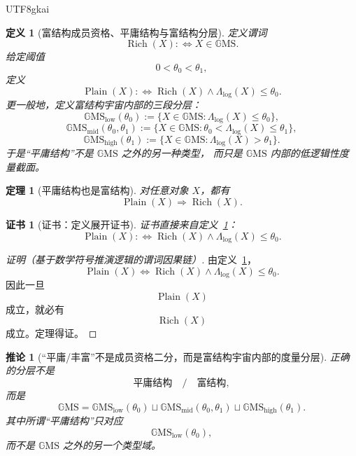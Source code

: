 \documentclass[12pt]{article}
\newtheorem{definition}{定义}[section]
\newtheorem{theorem}{定理}[section]
\newtheorem{corollary}{推论}[section]
\newtheorem{Certificate}{证书}[section]
\newcommand{\GMS}{\mathbb{G}\mathrm{MS}}
\begin{document}
\begin{CJK*}{UTF8}{gkai}
\begin{definition}[富结构成员资格、平庸结构与富结构分层]
\label{def:tex1-ch12-richness}
定义谓词
\[
  \operatorname{Rich}(X)
  :
  \Longleftrightarrow
  X\in \GMS.
\]
给定阈值
\[
  0<\theta_0<\theta_1,
\]
定义
\[
  \operatorname{Plain}(X)
  :
  \Longleftrightarrow
  \operatorname{Rich}(X)\wedge \Lambda_{\mathrm{log}}(X)\le \theta_0.
\]
更一般地，定义富结构宇宙内部的三段分层：
\[
  \GMS_{\mathrm{low}}(\theta_0)
  :=
  \{X\in \GMS:\Lambda_{\mathrm{log}}(X)\le \theta_0\},
\]
\[
  \GMS_{\mathrm{mid}}(\theta_0,\theta_1)
  :=
  \{X\in \GMS:\theta_0<\Lambda_{\mathrm{log}}(X)\le \theta_1\},
\]
\[
  \GMS_{\mathrm{high}}(\theta_1)
  :=
  \{X\in \GMS:\Lambda_{\mathrm{log}}(X)>\theta_1\}.
\]
于是“平庸结构”不是 \(\GMS\) 之外的另一种类型，
而只是 \(\GMS\) 内部的低逻辑性度量截面。
\end{definition}

\begin{theorem}[平庸结构也是富结构]
\label{thm:tex1-ch12-plain-rich}
对任意对象 \(X\)，都有
\[
  \operatorname{Plain}(X)\Rightarrow \operatorname{Rich}(X).
\]
\end{theorem}

\begin{Certificate}[证书：定义展开证书]
\label{cert:tex1-ch12-plain-rich}
证书直接来自定义~\ref{def:tex1-ch12-richness}：
\[
  \operatorname{Plain}(X)
  :
  \Longleftrightarrow
  \operatorname{Rich}(X)\wedge \Lambda_{\mathrm{log}}(X)\le \theta_0.
\]
\end{Certificate}

\begin{proof}[证明（基于数学符号推演逻辑的谓词因果链）]
由定义~\ref{def:tex1-ch12-richness}，
\[
  \operatorname{Plain}(X)
  \Longleftrightarrow
  \operatorname{Rich}(X)\wedge \Lambda_{\mathrm{log}}(X)\le \theta_0.
\]
因此一旦
\[
  \operatorname{Plain}(X)
\]
成立，就必有
\[
  \operatorname{Rich}(X)
\]
成立。定理得证。
\end{proof}

\begin{corollary}[“平庸/丰富”不是成员资格二分，而是富结构宇宙内部的度量分层]
\label{cor:tex1-ch12-layering}
正确的分层不是
\[
  \text{平庸结构}
  \quad/\quad
  \text{富结构},
\]
而是
\[
  \GMS
  =
  \GMS_{\mathrm{low}}(\theta_0)
  \sqcup
  \GMS_{\mathrm{mid}}(\theta_0,\theta_1)
  \sqcup
  \GMS_{\mathrm{high}}(\theta_1).
\]
其中所谓“平庸结构”只对应
\[
  \GMS_{\mathrm{low}}(\theta_0),
\]
而不是 \(\GMS\) 之外的另一个类型域。
\end{corollary}


\end{CJK*}
\end{document}
